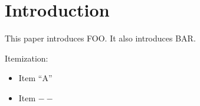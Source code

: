 \documentclass[12pt]{article}
\begin{document}
\section{Introduction}
This paper introduces FOO.
It also introduces BAR. %

Itemization:
\begin{itemize}
  \item Item ``A''
  \item Item $--$
\end{itemize}
\end{document}
